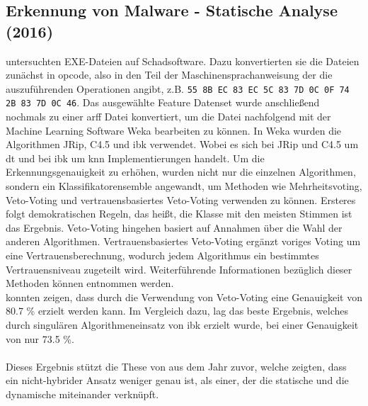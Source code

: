 \documentclass[
    12pt, %
    DIV10,
    ngerman, %
    a4paper, %
    oneside, %
    titlepage, %
    parskip=half, %
    headings=normal, %
    listof=totoc, %
    bibliography=totoc, %
    index=totoc, %
    captions=tableheading, %
    final %
]{scrreprt}
\begin{document}
\subsection{Erkennung von Malware - Statische Analyse (2016)}
\textcite{More2016} untersuchten EXE-Dateien auf Schadsoftware. Dazu konvertierten sie die Dateien zunächst in \ac{opcode}, also in den Teil der Maschinensprachanweisung der die auszuführenden Operationen angibt, z.B. \texttt{55 8B EC 83 EC 5C 83 7D 0C 0F 74 2B 83 7D 0C 46}. Das ausgewählte Feature Datenset wurde anschlie{\ss}end nochmals zu einer \ac{arff} Datei konvertiert, um die Datei nachfolgend mit der Machine Learning Software Weka bearbeiten zu können. 
In Weka wurden die Algorithmen JRip, C4.5 und \ac{ibk} verwendet. Wobei es sich bei JRip und C4.5 um \ac{dt} und bei \ac{ibk} um \ac{knn} Implementierungen handelt. Um die Erkennungsgenauigkeit zu erhöhen, wurden nicht nur die einzelnen Algorithmen, sondern ein Klassifikatorensemble angewandt, um Methoden wie Mehrheitsvoting, Veto-Voting und vertrauensbasiertes Veto-Voting verwenden zu können. Ersteres folgt demokratischen Regeln, das hei{\ss}t, die Klasse mit den meisten Stimmen ist das Ergebnis. Veto-Voting hingehen basiert auf Annahmen über die Wahl der anderen Algorithmen. Vertrauensbasiertes Veto-Voting ergänzt voriges Voting um eine Vertrauensberechnung, wodurch jedem Algorithmus ein bestimmtes Vertrauensniveau zugeteilt wird. Weiterführende Informationen bezüglich dieser Methoden können \textcite{shahzad2013comparative} entnommen werden. \\
\textcite{More2016} konnten zeigen, dass durch die Verwendung von Veto-Voting eine Genauigkeit von 80.7 \% erzielt werden kann. Im Vergleich dazu, lag das beste Ergebnis, welches durch singulären Algorithmeneinsatz von \ac{ibk} erzielt wurde, bei einer Genauigkeit von nur 73.5 \%.\\\\
Dieses Ergebnis stützt die These von \textcite{Shijo2015} aus dem Jahr zuvor, welche zeigten, dass ein nicht-hybrider Ansatz weniger genau ist, als einer, der die statische und die dynamische miteinander verknüpft.
\end{document}
